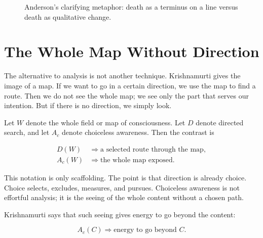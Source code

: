\begin{figure}
\centering
{}
\caption{Anderson's clarifying metaphor: death as a terminus on a line versus death as qualitative change.}
\end{figure}

\section{The Whole Map Without Direction}

The alternative to analysis is not another technique. Krishnamurti gives the image of a map. If we want to go in a certain direction, we use the map to find a route. Then we do not see the whole map; we see only the part that serves our intention. But if there is no direction, we simply look.

Let \(W\) denote the whole field or map of consciousness. Let \(D\) denote directed search, and let \(A_c\) denote choiceless awareness. Then the contrast is

\begin{align}
D(W) &\Rightarrow \text{a selected route through the map}, \\
A_c(W) &\Rightarrow \text{the whole map exposed}.
\end{align}

This notation is only scaffolding. The point is that direction is already choice. Choice selects, excludes, measures, and pursues. Choiceless awareness is not effortful analysis; it is the seeing of the whole content without a chosen path.

Krishnamurti says that such seeing gives energy to go beyond the content:

\begin{equation}
A_c(C)
\Rightarrow
\text{energy to go beyond } C.
\end{equation}

